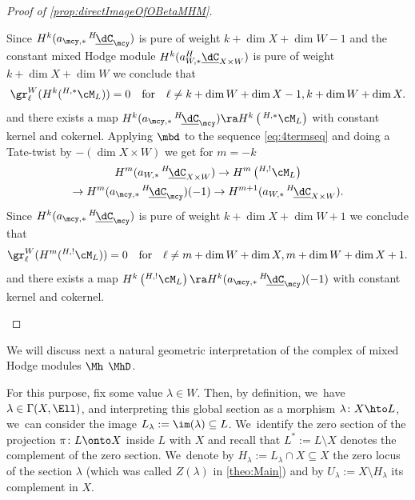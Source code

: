 \begin{proof}[Proof of \cref{prop:directImageOfOBetaMHM}]
\begin{enumerate}
Since $H^k(a_{\mcy,*}\, ^{H\!}\underline{\dC}_{\mcy})$ is pure of weight $k+ \dim X + \dim W -1$ and the constant mixed Hodge module $H^k(a_{W,*} ^{H\!}\underline{\dC}_{X \times W})$ is pure of weight $k +\dim X + \dim W$ we conclude that
\[
\gr^W_\ell (H^k({^{H,*}}\cM_L)) = 0 \quad \text{for} \quad \ell \neq k+ \dim W +\dim X -1,k+ \dim W +\dim X.
\]
and there exists a map $H^k(a_{\mcy,*} \, ^{H\!}\underline{\dC}_{\mcy}) \ra H^{k} \left({\,^{H,*}}\cM_L\right)$ with constant kernel and cokernel.
Applying $\mbd$ to the sequence \eqref{eq:4termseq} and doing a Tate-twist by $-(\dim X \times W)$ we get for $m = -k$
\begin{multline}
H^m(a_{W,*}\, ^{H\!}\underline{\dC}_{X \times W}) \to H^m\left({^{H,!}}\cM_L\right)\\
\to H^m(a_{\mcy,*} \, ^{H\!}\underline{\dC}_{\mcy})(-1) \to H^{m+1}(a_{W,*}\, ^{H\!}\underline{\dC}_{X \times W}).
\end{multline}
Since $H^k(a_{\mcy,*}\, ^{H\!}\underline{\dC}_{\mcy})$ is pure of weight $k+ \dim X + \dim W +1$ we conclude that
\[
\gr^W_\ell (H^m({^{H,!}}\cM_L)) = 0 \quad \text{for} \quad \ell \neq m+ \dim W +\dim X,m+ \dim W +\dim X+1.
\]
and there exists a map $ H^{k} \left({^{H,!}}\cM_L\right) \ra H^k(a_{\mcy,*} \, ^{H\!}\underline{\dC}_{\mcy})(-1)$ with constant kernel and cokernel.\qedhere
\end{enumerate}
\end{proof}

We will discuss next a natural geometric interpretation of the complex of mixed Hodge modules $\Mh$ \resp $\MhD$.

For this purpose, fix some value
$\lambda\in W$. Then, by definition, we~have $\lambda\in \Gamma(X, \Ell)$, and interpreting this global section as a morphism $\lambda \colon X \hto L$, we~can consider the image $L_\lambda:=\im(\lambda)\subseteq L$. We~identify the zero section of the projection $\pi\colon L\onto X$ inside $L$ with $X$ and recall that $L^{*}:=L\setminus X$ denotes the complement of the zero section. We~denote by $H_\lambda:=
L_\lambda \cap X \subseteq X$ the zero locus of the section $\lambda$ (which was called $Z(\lambda)$ in \cref{theo:Main}) and by $U_\lambda := X\setminus H_\lambda$
its complement in $X$.

